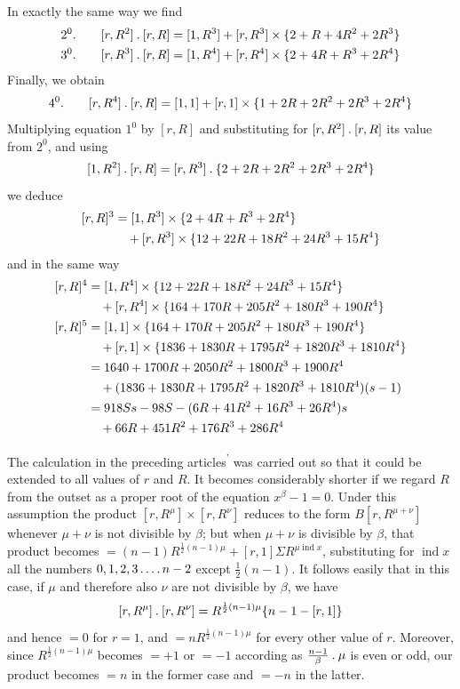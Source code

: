 In exactly the same way we find
\[
\begin{aligned}
2^0.\qquad[r,R^2]\mathbin{.}[r,R]&=[1,R^3]+[r,R^3]\times\{2+R+4R^2+2R^3\}\\
3^0.\qquad[r,R^3]\mathbin{.}[r,R]&=[1,R^4]+[r,R^4]\times\{2+4R+R^3+2R^4\}
\end{aligned}
\]
Finally, we obtain
\[
4^0.\qquad[r,R^4]\mathbin{.}[r,R]=[1,1]+[r,1]\times\{1+2R+2R^2+2R^3+2R^4\}
\]
Multiplying equation $1^0$ by $[r,R]$ and substituting for $[r,R^2]\mathbin{.}[r,R]$ its value from $2^0$, and using
\[
[1,R^2]\mathbin{.}[r,R]=[r,R^3]\mathbin{.}\{2+2R+2R^2+2R^3+2R^4\}
\]
we deduce
\[
\begin{aligned}
\relax[r,R]^3&=[1,R^3]\times\{2+4R+R^3+2R^4\}\\
&\quad+[r,R^3]\times\{12+22R+18R^2+24R^3+15R^4\}
\end{aligned}
\]
and in the same way
\[
\begin{aligned}
\relax[r,R]^4&=[1,R^4]\times\{12+22R+18R^2+24R^3+15R^4\}\\
&\quad+[r,R^4]\times\{164+170R+205R^2+180R^3+190R^4\}\\
\relax[r,R]^5&=[1,1]\times\{164+170R+205R^2+180R^3+190R^4\}\\
&\quad+[r,1]\times\{1836+1830R+1795R^2+1820R^3+1810R^4\}\\
&=1640+1700R+2050R^2+1800R^3+1900R^4\\
&\quad+(1836+1830R+1795R^2+1820R^3+1810R^4)(s-1)\\
&=918Ss-98S-(6R+41R^2+16R^3+26R^4)s\\
&\quad+66R+451R^2+176R^3+286R^4
\end{aligned}
\]

The calculation in the preceding articles\textsuperscript{'} was carried out so that it could be extended to all values of $r$ and $R$. It becomes considerably shorter if we regard $R$ from the outset as a proper root of the equation $x^\beta-1=0$. Under this assumption the product $[r,R^\mu]\times[r,R^\nu]$ reduces to the form $B[r,R^{\mu+\nu}]$ whenever $\mu+\nu$ is not divisible by $\beta$; but when $\mu+\nu$ is divisible by $\beta$, that product becomes $=(n-1)R^{\frac12(n-1)\mu}+[r,1]\Sigma R^{\mu\operatorname{ind}x}$, substituting for $\operatorname{ind}x$ all the numbers $0,1,2,3\mathinner{.\,.\,.\,.} n-2$ except $\frac12(n-1)$. It follows easily that in this case, if $\mu$ and therefore also $\nu$ are not divisible by $\beta$, we have
\[
[r,R^\mu]\mathbin{.}[r,R^\nu]=R^{\frac12(n-1)\mu}\{n-1-[r,1]\}
\]
and hence $=0$ for $r=1$, and $=nR^{\frac12(n-1)\mu}$ for every other value of $r$. Moreover, since $R^{\frac12(n-1)\mu}$ becomes $=+1$ or $=-1$ according as $\frac{n-1}\beta\mathbin{.}\mu$ is even or odd, our product becomes $=n$ in the former case and $=-n$ in the latter.

